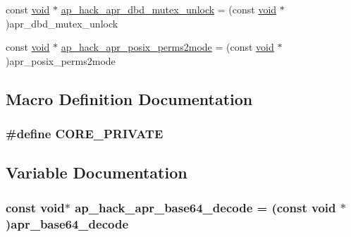 \begin{DoxyCompactItemize}
\item 
const \hyperlink{group__MOD__ISAPI_gacd6cdbf73df3d9eed42fa493d9b621a6}{void} $\ast$ \hyperlink{srclib_2apr-util_2exports_8c_aacb0b1080ce0e182d2cd6172e41c1257}{ap\+\_\+hack\+\_\+apr\+\_\+dbd\+\_\+mutex\+\_\+unlock} = (const \hyperlink{group__MOD__ISAPI_gacd6cdbf73df3d9eed42fa493d9b621a6}{void} $\ast$)apr\+\_\+dbd\+\_\+mutex\+\_\+unlock
\item 
const \hyperlink{group__MOD__ISAPI_gacd6cdbf73df3d9eed42fa493d9b621a6}{void} $\ast$ \hyperlink{srclib_2apr-util_2exports_8c_a6fc999140cdbbf1750303791a6a8415a}{ap\+\_\+hack\+\_\+apr\+\_\+posix\+\_\+perms2mode} = (const \hyperlink{group__MOD__ISAPI_gacd6cdbf73df3d9eed42fa493d9b621a6}{void} $\ast$)apr\+\_\+posix\+\_\+perms2mode
\end{DoxyCompactItemize}


\subsection{Macro Definition Documentation}
\subsubsection[{\texorpdfstring{C\+O\+R\+E\+\_\+\+P\+R\+I\+V\+A\+TE}{CORE_PRIVATE}}]{\setlength{\rightskip}{0pt plus 5cm}\#define C\+O\+R\+E\+\_\+\+P\+R\+I\+V\+A\+TE}\hypertarget{srclib_2apr-util_2exports_8c_ae4fb8f46fdb84502b5d4e5eba86405c5}{}\label{srclib_2apr-util_2exports_8c_ae4fb8f46fdb84502b5d4e5eba86405c5}


\subsection{Variable Documentation}
\subsubsection[{\texorpdfstring{ap\+\_\+hack\+\_\+apr\+\_\+base64\+\_\+decode}{ap_hack_apr_base64_decode}}]{\setlength{\rightskip}{0pt plus 5cm}const {\bf void}$\ast$ ap\+\_\+hack\+\_\+apr\+\_\+base64\+\_\+decode = (const {\bf void} $\ast$)apr\+\_\+base64\+\_\+decode}\hypertarget{srclib_2apr-util_2exports_8c_a6181f7861b075407dbeeab0661b4227c}{}\label{srclib_2apr-util_2exports_8c_a6181f7861b075407dbeeab0661b4227c}
